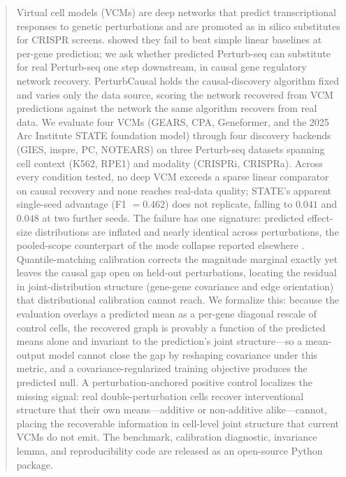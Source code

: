 \documentclass{article}
\theoremstyle{plain}
\theoremstyle{definition}
\theoremstyle{remark}
\begin{document}
\begin{abstract}
Virtual cell models (VCMs) are deep networks that predict transcriptional responses to genetic perturbations and are promoted as in silico substitutes for CRISPR screens. \citet{ahlmanneltze2025} showed they fail to beat simple linear baselines at per-gene prediction; we ask whether predicted Perturb-seq can substitute for real Perturb-seq one step downstream, in causal gene regulatory network recovery. PerturbCausal holds the causal-discovery algorithm fixed and varies only the data source, scoring the network recovered from VCM predictions against the network the same algorithm recovers from real data. We evaluate four VCMs (GEARS, CPA, Geneformer, and the 2025 Arc Institute STATE foundation model) through four discovery backends (GIES, inspre, PC, NOTEARS) on three Perturb-seq datasets spanning cell context (K562, RPE1) and modality (CRISPRi, CRISPRa). Across every condition tested, no deep VCM exceeds a sparse linear comparator on causal recovery and none reaches real-data quality; STATE's apparent single-seed advantage (F1 $=0.462$) does not replicate, falling to $0.041$ and $0.048$ at two further seeds. The failure has one signature: predicted effect-size distributions are inflated and nearly identical across perturbations, the pooled-scope counterpart of the mode collapse reported elsewhere \citep{mejia2025diversity}. Quantile-matching calibration corrects the magnitude marginal exactly yet leaves the causal gap open on held-out perturbations, locating the residual in joint-distribution structure (gene-gene covariance and edge orientation) that distributional calibration cannot reach. We formalize this: because the evaluation overlays a predicted mean as a per-gene diagonal rescale of control cells, the recovered graph is provably a function of the predicted means alone and invariant to the prediction's joint structure---so a mean-output model cannot close the gap by reshaping covariance under this metric, and a covariance-regularized training objective produces the predicted null. A perturbation-anchored positive control localizes the missing signal: real double-perturbation cells recover interventional structure that their own means---additive or non-additive alike---cannot, placing the recoverable information in cell-level joint structure that current VCMs do not emit. The benchmark, calibration diagnostic, invariance lemma, and reproducibility code are released as an open-source Python package.
\end{abstract}
\end{document}
